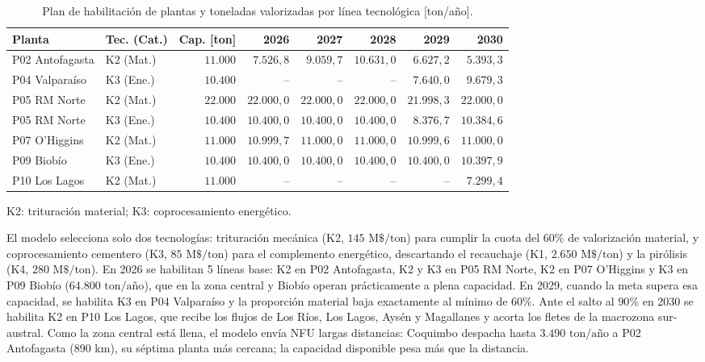 \documentclass[letterpaper]{article}
\begin{document}
\begin{table}[H]
\centering
\caption{Plan de habilitación de plantas y toneladas valorizadas por línea tecnológica [ton/año].}
\label{tab:plantas_uso}
\small
\setlength{\tabcolsep}{3pt}
\begin{tabular*}{\linewidth}{@{\extracolsep{\fill}}llrrrrrr@{}}
\hline
\textbf{Planta} & \textbf{Tec. (Cat.)} & \textbf{Cap. [ton]} & \textbf{2026} & \textbf{2027} & \textbf{2028} & \textbf{2029} & \textbf{2030} \\
\hline
P02 Antofagasta & K2 (Mat.) & $11.000$ & $7.526,8$ & $9.059,7$ & $10.631,0$ & $6.627,2$ & $5.393,3$ \\
P04 Valparaíso & K3 (Ene.) & $10.400$ & -- & -- & -- & $7.640,0$ & $9.679,3$ \\
P05 RM Norte & K2 (Mat.) & $22.000$ & $22.000,0$ & $22.000,0$ & $22.000,0$ & $21.998,3$ & $22.000,0$ \\
P05 RM Norte & K3 (Ene.) & $10.400$ & $10.400,0$ & $10.400,0$ & $10.400,0$ & $8.376,7$ & $10.384,6$ \\
P07 O'Higgins & K2 (Mat.) & $11.000$ & $10.999,7$ & $11.000,0$ & $11.000,0$ & $10.999,6$ & $11.000,0$ \\
P09 Biobío & K3 (Ene.) & $10.400$ & $10.400,0$ & $10.400,0$ & $10.400,0$ & $10.400,0$ & $10.397,9$ \\
P10 Los Lagos & K2 (Mat.) & $11.000$ & -- & -- & -- & -- & $7.299,4$ \\
\hline
\end{tabular*}
\par\smallskip
{\footnotesize K2: trituración material; K3: coprocesamiento energético.}
\end{table}

El modelo selecciona solo dos tecnologías: trituración mecánica (K2, $145\text{ M\$/ton}$) para cumplir la cuota del 60\% de valorización material, y coprocesamiento cementero (K3, $85\text{ M\$/ton}$) para el complemento energético, descartando el recauchaje (K1, $2.650\text{ M\$/ton}$) y la pirólisis (K4, $280\text{ M\$/ton}$). En 2026 se habilitan 5 líneas base: K2 en P02 Antofagasta, K2 y K3 en P05 RM Norte, K2 en P07 O'Higgins y K3 en P09 Biobío ($64.800\text{ ton/año}$), que en la zona central y Biobío operan prácticamente a plena capacidad. En 2029, cuando la meta supera esa capacidad, se habilita K3 en P04 Valparaíso y la proporción material baja exactamente al mínimo de $60\%$. Ante el salto al $90\%$ en 2030 se habilita K2 en P10 Los Lagos, que recibe los flujos de Los Ríos, Los Lagos, Aysén y Magallanes y acorta los fletes de la macrozona sur-austral. Como la zona central está llena, el modelo envía NFU largas distancias: Coquimbo despacha hasta $3.490\text{ ton/año}$ a P02 Antofagasta (890 km), su séptima planta más cercana; la capacidad disponible pesa más que la distancia.
\end{document}
